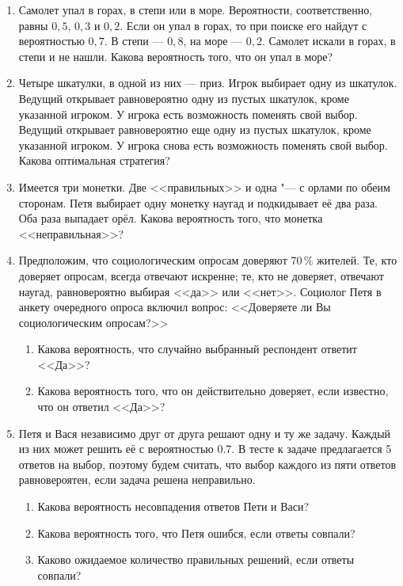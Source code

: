 \documentclass[pdftex,12pt,a4paper]{article}
\begin{document}
\begin{enumerate}
\item Самолет упал в горах, в степи или в море. Вероятности,
соответственно, равны $0,5$, $0,3$ и $0,2$. Если он упал в горах,
то при поиске его найдут с вероятностью $0,7$. В степи --- $0,8$, на
море --- $0,2$. Самолет искали в горах, в степи и не нашли. Какова
вероятность того, что он упал в море?


\item Четыре шкатулки, в одной из них --- приз. Игрок выбирает одну из шкатулок. Ведущий открывает равновероятно одну из пустых шкатулок, кроме указанной игроком. У игрока есть возможность поменять свой выбор. Ведущий открывает равновероятно еще одну из пустых шкатулок, кроме указанной игроком. У игрока снова есть возможность поменять свой выбор. Какова оптимальная стратегия?


\item Имеется три монетки. Две <<правильных>> и одна "--- с орлами по
обеим сторонам. Петя выбирает одну монетку наугад и подкидывает её
два раза. Оба раза выпадает орёл. Какова вероятность того, что
монетка <<неправильная>>?


\item Предположим, что социологическим опросам доверяют 70\,\% жителей. Те, кто доверяет опросам, всегда отвечают искренне; те, кто не доверяет, отвечают наугад, равновероятно выбирая <<да>> или <<нет>>. Социолог Петя  в анкету очередного опроса включил вопрос: <<Доверяете ли Вы социологическим опросам?>>
\begin{enumerate}
\item Какова вероятность, что случайно выбранный респондент ответит <<Да>>?
\item  Какова вероятность того, что он действительно доверяет, если известно, что он ответил <<Да>>?
\end{enumerate}

\item Петя и Вася независимо друг от друга решают одну и ту же задачу. Каждый из них может решить её с вероятностью 0.7. В тесте к задаче предлагается 5 ответов на выбор, поэтому будем считать, что выбор каждого из пяти ответов равновероятен, если задача решена неправильно.
\begin{enumerate}
\item Какова вероятность несовпадения ответов Пети и Васи?
\item  Какова вероятность того, что Петя ошибся, если ответы совпали?
\item  Каково ожидаемое количество правильных решений, если ответы совпали?
\end{enumerate}


\end{enumerate}
\end{document}
